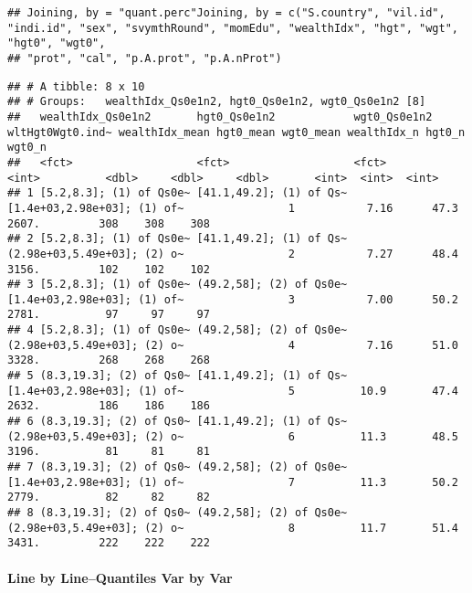 \documentclass[
]{article}
\newenvironment{Shaded}{\begin{snugshade}}{\end{snugshade}}
\newcommand{\CommentTok}[1]{\textcolor[rgb]{0.56,0.35,0.01}{\textit{#1}}}
\newcommand{\NormalTok}[1]{#1}
\newcommand{\OperatorTok}[1]{\textcolor[rgb]{0.81,0.36,0.00}{\textbf{#1}}}
\begin{document}
\begin{verbatim}
## Joining, by = "quant.perc"Joining, by = c("S.country", "vil.id", "indi.id", "sex", "svymthRound", "momEdu", "wealthIdx", "hgt", "wgt", "hgt0", "wgt0",
## "prot", "cal", "p.A.prot", "p.A.nProt")
\end{verbatim}

\begin{Shaded}
\end{Shaded}

\begin{verbatim}
## # A tibble: 8 x 10
## # Groups:   wealthIdx_Qs0e1n2, hgt0_Qs0e1n2, wgt0_Qs0e1n2 [8]
##   wealthIdx_Qs0e1n2       hgt0_Qs0e1n2            wgt0_Qs0e1n2                wltHgt0Wgt0.ind~ wealthIdx_mean hgt0_mean wgt0_mean wealthIdx_n hgt0_n wgt0_n
##   <fct>                   <fct>                   <fct>                                  <int>          <dbl>     <dbl>     <dbl>       <int>  <int>  <int>
## 1 [5.2,8.3]; (1) of Qs0e~ [41.1,49.2]; (1) of Qs~ [1.4e+03,2.98e+03]; (1) of~                1           7.16      47.3     2607.         308    308    308
## 2 [5.2,8.3]; (1) of Qs0e~ [41.1,49.2]; (1) of Qs~ (2.98e+03,5.49e+03]; (2) o~                2           7.27      48.4     3156.         102    102    102
## 3 [5.2,8.3]; (1) of Qs0e~ (49.2,58]; (2) of Qs0e~ [1.4e+03,2.98e+03]; (1) of~                3           7.00      50.2     2781.          97     97     97
## 4 [5.2,8.3]; (1) of Qs0e~ (49.2,58]; (2) of Qs0e~ (2.98e+03,5.49e+03]; (2) o~                4           7.16      51.0     3328.         268    268    268
## 5 (8.3,19.3]; (2) of Qs0~ [41.1,49.2]; (1) of Qs~ [1.4e+03,2.98e+03]; (1) of~                5          10.9       47.4     2632.         186    186    186
## 6 (8.3,19.3]; (2) of Qs0~ [41.1,49.2]; (1) of Qs~ (2.98e+03,5.49e+03]; (2) o~                6          11.3       48.5     3196.          81     81     81
## 7 (8.3,19.3]; (2) of Qs0~ (49.2,58]; (2) of Qs0e~ [1.4e+03,2.98e+03]; (1) of~                7          11.3       50.2     2779.          82     82     82
## 8 (8.3,19.3]; (2) of Qs0~ (49.2,58]; (2) of Qs0e~ (2.98e+03,5.49e+03]; (2) o~                8          11.7       51.4     3431.         222    222    222
\end{verbatim}

\hypertarget{line-by-linequantiles-var-by-var}{%
\paragraph{Line by Line--Quantiles Var by
Var}\label{line-by-linequantiles-var-by-var}}
\end{document}
